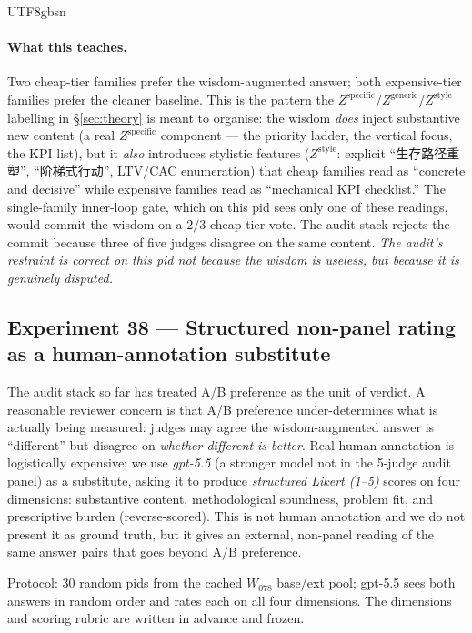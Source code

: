 \documentclass{article}
\begin{document}
\begin{CJK*}{UTF8}{gbsn}
\paragraph{What this teaches.} Two cheap-tier families prefer the
wisdom-augmented answer; both expensive-tier families prefer the
cleaner baseline. This is the pattern the
\(Z^{\mathrm{specific}} / Z^{\mathrm{generic}} / Z^{\mathrm{style}}\)
labelling in \S\ref{sec:theory} is meant to organise: the wisdom
\emph{does}
inject substantive new content (a real \(Z^{\mathrm{specific}}\)
component --- the priority ladder, the vertical focus, the KPI
list), but it \emph{also} introduces stylistic features
(\(Z^{\mathrm{style}}\): explicit ``生存路径重塑'',
``阶梯式行动'', LTV/CAC enumeration) that cheap families read as
``concrete and decisive'' while expensive families read as
``mechanical KPI checklist.'' The single-family inner-loop gate,
which on this pid sees only one of these readings, would commit
the wisdom on a \(2/3\) cheap-tier vote. The audit stack rejects
the commit because three of five judges disagree on the same
content. \emph{The audit's restraint is correct on this pid not
because the wisdom is useless, but because it is genuinely
disputed.}

\subsection{Experiment 38 — Structured non-panel rating as a
human-annotation substitute}
\label{sec:exp38}

The audit stack so far has treated A/B preference as the unit of
verdict. A reasonable reviewer concern is that A/B preference
under-determines what is actually being measured: judges may
agree the wisdom-augmented answer is ``different'' but disagree on
\emph{whether different is better}. Real human annotation is
logistically expensive; we use \emph{gpt-5.5} (a stronger model
not in the 5-judge audit panel) as a substitute, asking it to
produce \emph{structured Likert (1--5)} scores on four
dimensions: substantive content, methodological soundness,
problem fit, and prescriptive burden (reverse-scored). This is not
human annotation and we do not present it as ground truth, but it
gives an external, non-panel reading of the same answer pairs that
goes beyond A/B preference.

Protocol: 30 random pids from the cached \(W_{078}\) base/ext
pool; gpt-5.5 sees both answers in random order and rates each on
all four dimensions. The dimensions and scoring rubric are written
in advance and frozen.


\end{CJK*}
\end{document}
